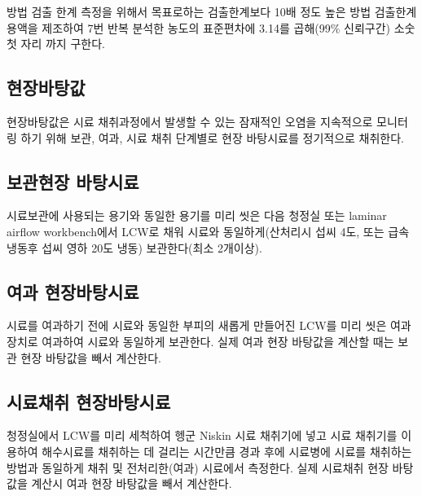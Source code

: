 \documentclass[
]{book}
\begin{document}
방법 검출 한계 측정을 위해서 목표로하는 검출한계보다 10배 정도 높은 방법 검출한계 용액을 제조하여 7번 반복 분석한 농도의 표준편차에 3.14를 곱해(99\% 신뢰구간) 소숫 첫 자리 까지 구한다.

\hypertarget{uxd604uxc7a5uxbc14uxd0d5uxac12}{%
\subsection{현장바탕값}\label{uxd604uxc7a5uxbc14uxd0d5uxac12}}

현장바탕값은 시료 채취과정에서 발생할 수 있는 잠재적인 오염을 지속적으로 모니터링 하기 위해 보관, 여과, 시료 채취 단계별로 현장 바탕시료를 정기적으로 채취한다.

\hypertarget{uxbcf4uxad00uxd604uxc7a5-uxbc14uxd0d5uxc2dcuxb8cc}{%
\subsection{보관현장 바탕시료}\label{uxbcf4uxad00uxd604uxc7a5-uxbc14uxd0d5uxc2dcuxb8cc}}

시료보관에 사용되는 용기와 동일한 용기를 미리 씻은 다음 청정실 또는 laminar airflow workbench에서 LCW로 채워 시료와 동일하게(산처리시 섭씨 4도, 또는 급속 냉동후 섭씨 영하 20도 냉동) 보관한다(최소 2개이상).

\hypertarget{uxc5ecuxacfc-uxd604uxc7a5uxbc14uxd0d5uxc2dcuxb8cc}{%
\subsection{여과 현장바탕시료}\label{uxc5ecuxacfc-uxd604uxc7a5uxbc14uxd0d5uxc2dcuxb8cc}}

시료를 여과하기 전에 시료와 동일한 부피의 새롭게 만들어진 LCW를 미리 씻은 여과장치로 여과하여 시료와 동일하게 보관한다. 실제 여과 현장 바탕값을 계산할 때는 보관 현장 바탕값을 빼서 계산한다.

\hypertarget{uxc2dcuxb8ccuxcc44uxcde8-uxd604uxc7a5uxbc14uxd0d5uxc2dcuxb8cc}{%
\subsection{시료채취 현장바탕시료}\label{uxc2dcuxb8ccuxcc44uxcde8-uxd604uxc7a5uxbc14uxd0d5uxc2dcuxb8cc}}

청정실에서 LCW를 미리 세척하여 헹군 Niskin 시료 채취기에 넣고 시료 채취기를 이용하여 해수시료를 채취하는 데 걸리는 시간만큼 경과 후에 시료병에 시료를 채취하는 방법과 동일하게 채취 및 전처리한(여과) 시료에서 측정한다. 실제 시료채취 현장 바탕값을 계산시 여과 현장 바탕값을 빼서 계산한다.
\end{document}
